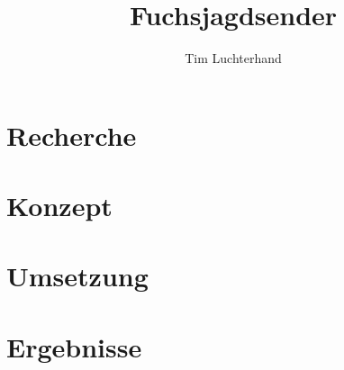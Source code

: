 \documentclass[DIN, pagenumber=false, fontsize=11pt, parskip=half]{scrartcl}
\title{Fuchsjagdsender}
\author{Tim Luchterhand}
\begin{document}
\maketitle


\section{Recherche}

\section{Konzept}

\section{Umsetzung}

\section{Ergebnisse}
\end{document}
